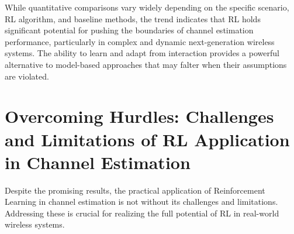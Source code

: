 \documentclass[journal,twocolumn]{IEEEtran}
\begin{document}
While quantitative comparisons vary widely depending on the specific scenario, RL algorithm, and baseline methods, the trend indicates that RL holds significant potential for pushing the boundaries of channel estimation performance, particularly in complex and dynamic next-generation wireless systems. The ability to learn and adapt from interaction provides a powerful alternative to model-based approaches that may falter when their assumptions are violated.

\section{Overcoming Hurdles: Challenges and Limitations of RL Application in Channel Estimation}
Despite the promising results, the practical application of Reinforcement Learning in channel estimation is not without its challenges and limitations. Addressing these is crucial for realizing the full potential of RL in real-world wireless systems.
\end{document}
